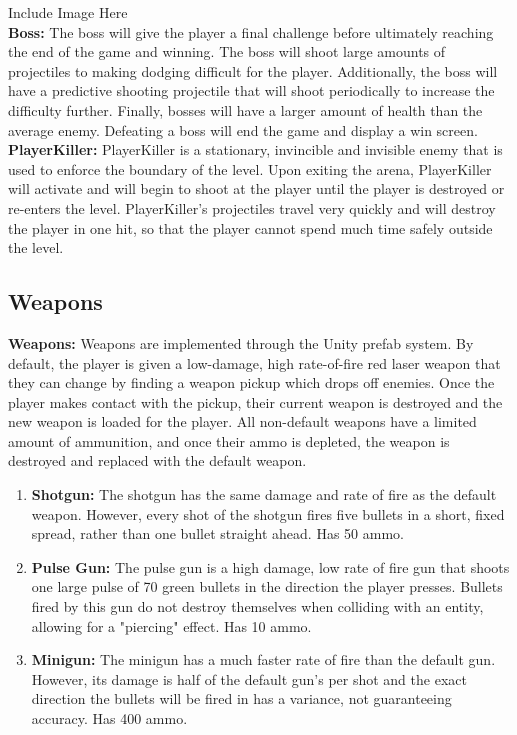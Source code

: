 \documentclass[12pt]{article}       %
\begin{document}
Include Image Here \\

{\bf Boss:} The boss will give the player a final challenge before ultimately reaching the end of the game and winning. The boss will shoot large amounts of projectiles to making dodging difficult for the player. Additionally, the boss will have a predictive shooting projectile that will shoot periodically to increase the difficulty further. Finally, bosses will have a larger amount of health than the average enemy. Defeating a boss will end the game and display a win screen. \\

{\bf PlayerKiller:} PlayerKiller is a stationary, invincible and invisible enemy that is used to enforce the boundary of the level. Upon exiting the arena, PlayerKiller will activate and will begin to shoot at the player until the player is destroyed or re-enters the level. PlayerKiller's projectiles travel very quickly and will destroy the player in one hit, so that the player cannot spend much time safely outside the level.


\subsection{Weapons} %

	{\bf Weapons:} Weapons are implemented through the Unity prefab system. By default, the player is given a low-damage, high rate-of-fire red laser weapon that they can change by finding a weapon pickup which drops off enemies. Once the player makes contact with the pickup, their current weapon is destroyed and the new weapon is loaded for the player. All non-default weapons have a limited amount of ammunition, and once their ammo is depleted, the weapon is destroyed and replaced with the default weapon.

	\begin{enumerate}
	\item {\bf Shotgun:} The shotgun has the same damage and rate of fire as the default weapon. However, every shot of the shotgun fires five bullets in a short, fixed spread, rather than one bullet straight ahead. Has 50 ammo.

	\item {\bf Pulse Gun:} The pulse gun is a high damage, low rate of fire gun that shoots one large pulse of 70 green bullets in the direction the player presses. Bullets fired by this gun do not destroy themselves when colliding with an entity, allowing for a "piercing" effect. Has 10 ammo.

	\item {\bf Minigun:} The minigun has a much faster rate of fire than the default gun. However, its damage is half of the default gun's per shot and the exact direction the bullets will be fired in has a variance, not guaranteeing accuracy. Has 400 ammo.
	\end{enumerate}
\end{document}
